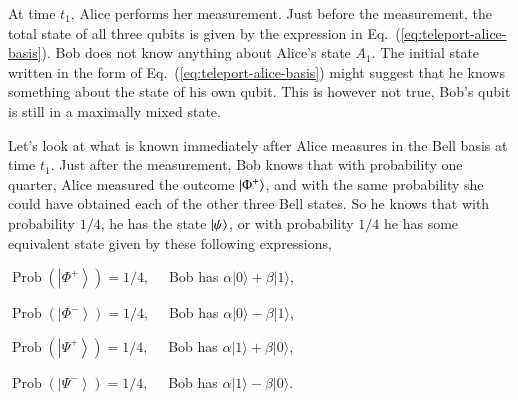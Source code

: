 At time $t_1$, Alice performs her measurement.
Just before the measurement, the total state of all three qubits is given by the expression in Eq.~(\ref{eq:teleport-alice-basis}).
Bob does not know anything about Alice's state $A_1$.
The initial state written in the form of Eq.~(\ref{eq:teleport-alice-basis}) might suggest that he knows something about the state of his own qubit.
This is however not true, Bob's qubit is still in a maximally mixed state.

Let's look at what is known immediately after Alice measures in the Bell basis at time $t_1$.
Just after the measurement, Bob knows that with probability one quarter, Alice measured the outcome $\left| \Phi^+ \right\rangle$, and with the same probability she could have obtained each of the other three  Bell states.
So he knows that with probability $1/4$, he has the state $\left| \psi \right\rangle$, or with probability $1/4$ he has some equivalent state given by these following expressions,

\hspace{2cm} $\operatorname{Prob}\left(\left|\Phi^{+}\right\rangle\right)=1 / 4, \quad$ Bob has $\alpha|0\rangle+\beta|1\rangle$,

\hspace{2cm} $\operatorname{Prob}\left(\left|\Phi^{-}\right\rangle\right)=1 / 4, \quad$ Bob has $\alpha|0\rangle-\beta|1\rangle$,

\hspace{2cm} $\operatorname{Prob}\left(\left|\Psi^{+}\right\rangle\right)=1 / 4, \quad$ Bob has $\alpha|1\rangle+\beta|0\rangle$,

\hspace{2cm} $\operatorname{Prob}\left(\left|\Psi^{-}\right\rangle\right)=1 / 4, \quad$ Bob has $\alpha|1\rangle-\beta|0\rangle$.

